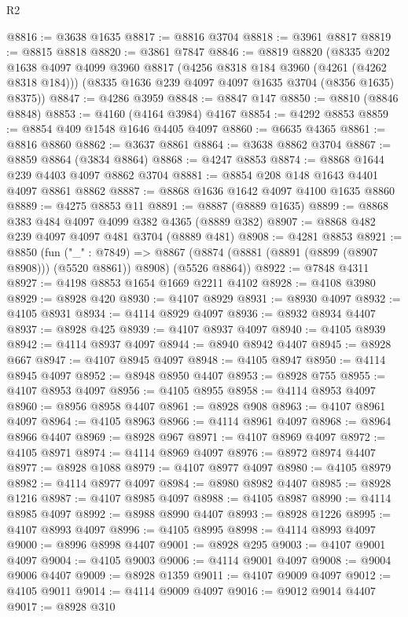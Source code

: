 \begin{lexlean}{R2}
\begin{coremodule}
@8816 := @3638 @1635
@8817 := @8816 @3704
@8818 := @3961 @8817
@8819 := @8815 @8818
@8820 := @3861 @7847
@8846 := @8819
    @8820
    (@8335
      @202
      @1638
      @4097
      @4099
      @3960
      @8817
      (@4256 @8318 @184 @3960 (@4261 (@4262 @8318 @184)))
      (@8335 @1636 @239 @4097 @4097 @1635 @3704 (@8356 @1635) @8375))
@8847 := @4286 @3959
@8848 := @8847 @147
@8850 := @8810 (@8846 @8848)
@8853 := @4160 (@4164 @3984) @4167
@8854 := @4292 @8853
@8859 := @8854 @409 @1548 @1646 @4405 @4097
@8860 := @6635 @4365
@8861 := @8816 @8860
@8862 := @3637 @8861
@8864 := @3638 @8862 @3704
@8867 := @8859 @8864 (@3834 @8864)
@8868 := @4247 @8853
@8874 := @8868 @1644 @239 @4403 @4097 @8862 @3704
@8881 := @8854 @208 @148 @1643 @4401 @4097 @8861 @8862
@8887 := @8868 @1636 @1642 @4097 @4100 @1635 @8860
@8889 := @4275 @8853 @11
@8891 := @8887 (@8889 @1635)
@8899 := @8868 @383 @484 @4097 @4099 @382 @4365 (@8889 @382)
@8907 := @8868 @482 @239 @4097 @4097 @481 @3704 (@8889 @481)
@8908 := @4281 @8853
@8921 := @8850
    (fun ("_" : @7849) =>
    @8867 (@8874 (@8881 (@8891 (@8899 (@8907 @8908))) (@5520 @8861)) @8908) (@5526 @8864))
@8922 := @7848 @4311
@8927 := @4198 @8853 @1654 @1669 @2211 @4102
@8928 := @4108 @3980
@8929 := @8928 @420
@8930 := @4107 @8929
@8931 := @8930 @4097
@8932 := @4105 @8931
@8934 := @4114 @8929 @4097
@8936 := @8932 @8934 @4407
@8937 := @8928 @425
@8939 := @4107 @8937 @4097
@8940 := @4105 @8939
@8942 := @4114 @8937 @4097
@8944 := @8940 @8942 @4407
@8945 := @8928 @667
@8947 := @4107 @8945 @4097
@8948 := @4105 @8947
@8950 := @4114 @8945 @4097
@8952 := @8948 @8950 @4407
@8953 := @8928 @755
@8955 := @4107 @8953 @4097
@8956 := @4105 @8955
@8958 := @4114 @8953 @4097
@8960 := @8956 @8958 @4407
@8961 := @8928 @908
@8963 := @4107 @8961 @4097
@8964 := @4105 @8963
@8966 := @4114 @8961 @4097
@8968 := @8964 @8966 @4407
@8969 := @8928 @967
@8971 := @4107 @8969 @4097
@8972 := @4105 @8971
@8974 := @4114 @8969 @4097
@8976 := @8972 @8974 @4407
@8977 := @8928 @1088
@8979 := @4107 @8977 @4097
@8980 := @4105 @8979
@8982 := @4114 @8977 @4097
@8984 := @8980 @8982 @4407
@8985 := @8928 @1216
@8987 := @4107 @8985 @4097
@8988 := @4105 @8987
@8990 := @4114 @8985 @4097
@8992 := @8988 @8990 @4407
@8993 := @8928 @1226
@8995 := @4107 @8993 @4097
@8996 := @4105 @8995
@8998 := @4114 @8993 @4097
@9000 := @8996 @8998 @4407
@9001 := @8928 @295
@9003 := @4107 @9001 @4097
@9004 := @4105 @9003
@9006 := @4114 @9001 @4097
@9008 := @9004 @9006 @4407
@9009 := @8928 @1359
@9011 := @4107 @9009 @4097
@9012 := @4105 @9011
@9014 := @4114 @9009 @4097
@9016 := @9012 @9014 @4407
@9017 := @8928 @310

\end{coremodule}
\end{lexlean}
